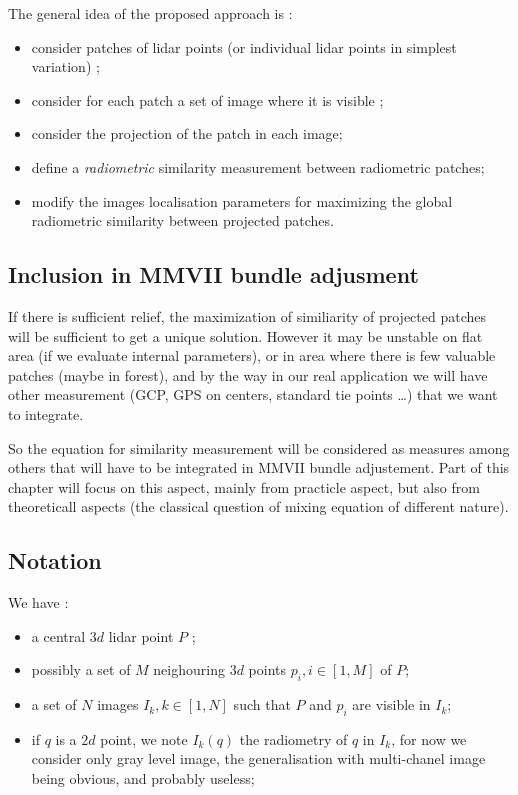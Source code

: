 The general idea of the proposed approach is :

\begin{itemize}
   \item  consider patches of lidar points (or individual lidar points in simplest variation) ;
   \item  consider for each patch a set of image where it is visible ;
   \item  consider the projection of the patch in each image;
   \item  define a \emph{radiometric} similarity  measurement between radiometric
          patches;
   \item  modify the images localisation parameters  for maximizing the global radiometric similarity between 
          projected patches.
\end{itemize}


\subsection{Inclusion in MMVII bundle adjusment}

If there is sufficient relief, the maximization of similiarity of projected patches 
will be sufficient to get a unique solution. However it may be unstable on flat area (if we evaluate internal parameters),
or in area where there is few valuable patches (maybe in forest), and  by the way in our real
application we will have other measurement (GCP, GPS on centers, standard tie points \dots ) that we want to
integrate.

So the equation for similarity measurement will be considered as measures among others that will have
to be integrated in MMVII bundle adjustement. Part of this chapter will focus on this aspect,
mainly from practicle aspect, but also from theoreticall aspects (the classical question
of mixing equation of different nature).


\subsection{Notation}
\label{LidImReg:Notation}

We have :

\begin{itemize}
    \item a central $3d$ lidar point $P$ ;
    \item possibly a set of $M$ neighouring $3d$ points  $p_i, i \in [1,M] $ of $P$;
    \item a set of $N$ images $I_k, k \in [1,N] $ such that $P$ and $p_i$ are visible in $I_k$;
    \item if $q$ is a $2d$ point, we note $I_k(q)$ the radiometry of $q$ in $I_k$,
          for now we consider only gray level image, the generalisation with multi-chanel
          image being obvious, and probably useless;
\end{itemize}

